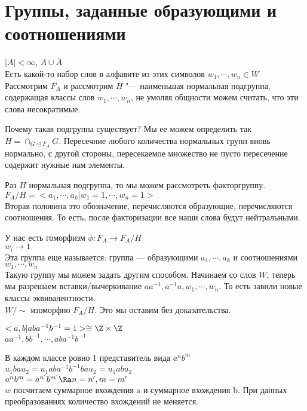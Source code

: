 ﻿\section{Группы, заданные образующими и соотношениями}
$|A| < \infty$, $A \cup \bar{A}$\\
Есть какой-то набор слов в алфавите из этих символов $w_1, \cdots, w_n \in W$\\
Рассмотрим $F_A$ и рассмотрим $H$ "--- наименьшая нормальная подгруппа, содержащая классы слов $w_1, \cdots, w_n$, не умоляя общности 
можем считать, что эти слова несократимые.

Почему такая подгруппа существует? Мы ее можем определить так $H = \cap_{G \unlhd F_A} G$.
Пересечние любого количества нормальных групп вновь нормально, с другой стороны, пересекаемое множество не пусто пересечение содержит 
нужные нам элементы. 

Раз $H$ нормальная подгруппа, то мы можем рассмотреть факторгруппу.
$F_A/H = <a_1, \cdots, a_k|w_1 = 1, \cdots, w_n = 1>$\\
Вторая половина это обозначение, перечисляются образующие, перечисляются соотношения. То есть, 
после факторизации все наши слова будут нейтральными. 

У нас есть гоморфизм
$\phi \colon F_A \to F_A/H$\\
$w_i \to 1$ \\
Эта группа еще называется: группа --- образующими $a_1, \cdots, a_k$ и соотношениями $w_1, \cdots, w_n$\\


Такую группу мы можем задать другим способом. Начинаем со слов $W$,
теперь мы разрешаем вставки/вычеркивание $aa^{-1}, a^{-1}a, w_1, \cdots, w_n$. То есть 
завили новые классы эквивалентности.\\
$W/\sim$ изоморфно $F_A/H$. Это мы оставим без доказательства.

\begin{exmp}
$<a, b| aba^{-1}b^{-1} = 1> \cong \Z \times \Z$\\
$aa^{-1}, bb^{-1}, \cdots, aba^{-1}b^{-1}$

В каждом классе ровно 1 представитель вида $a^nb^m$\\
$u_1bau_2 = u_1aba^{-1}b^{-1}bau_2 = u_1abu_2$\\

$a^nb^m = a^{n'}b^{m'} \Ra n = n', m = m'$\\
$w$ посчитаем суммарное вхождения a и суммарное вхождения b.
При данных преобразованиях количество вхождений не меняется.  
\end{exmp}